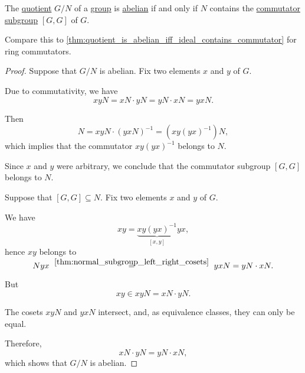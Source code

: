 \begin{proposition}\label{thm:quotient_is_abelian_iff_subgroup_contains_commutator}
  The \hyperref[def:group/quotient]{quotient} \( G / N \) of a \hyperref[def:group]{group} is \hyperref[def:abelian_group]{abelian} if and only if \( N \) contains the \hyperref[def:group_commutator]{commutator subgroup} \( [G, G] \) of \( G \).
\end{proposition}
\begin{comments}
  \item Compare this to \cref{thm:quotient_is_abelian_iff_ideal_contains_commutator} for ring commutators.
\end{comments}
\begin{proof}
  \SufficiencySubProof Suppose that \( G / N \) is abelian. Fix two elements \( x \) and \( y \) of \( G \).

  Due to commutativity, we have
  \begin{equation*}
    xyN = xN \cdot yN = yN \cdot xN = yxN.
  \end{equation*}

  Then
  \begin{equation*}
    N = xyN \cdot (yxN)^{-1} = (xy(yx)^{-1})N,
  \end{equation*}
  which implies that the commutator \( xy(yx)^{-1} \) belongs to \( N \).

  Since \( x \) and \( y \) were arbitrary, we conclude that the commutator subgroup \( [G, G] \) belongs to \( N \).

  \NecessitySubProof Suppose that \( [G, G] \subseteq N \). Fix two elements \( x \) and \( y \) of \( G \).

  We have
  \begin{equation*}
    xy = \underbrace{xy (yx)^{-1}}_{[x, y]} yx,
  \end{equation*}
  hence \( xy \) belongs to
  \begin{equation*}
    Nyx
    \reloset {\ref{thm:normal_subgroup_left_right_cosets}} =
    yxN
    =
    yN \cdot xN.
  \end{equation*}

  But
  \begin{equation*}
    xy \in xyN = xN \cdot yN.
  \end{equation*}

  The cosets \( xyN \) and \( yxN \) intersect, and, as equivalence classes, they can only be equal.

  Therefore,
  \begin{equation*}
    xN \cdot yN = yN \cdot xN,
  \end{equation*}
  which shows that \( G / N \) is abelian.
\end{proof}

